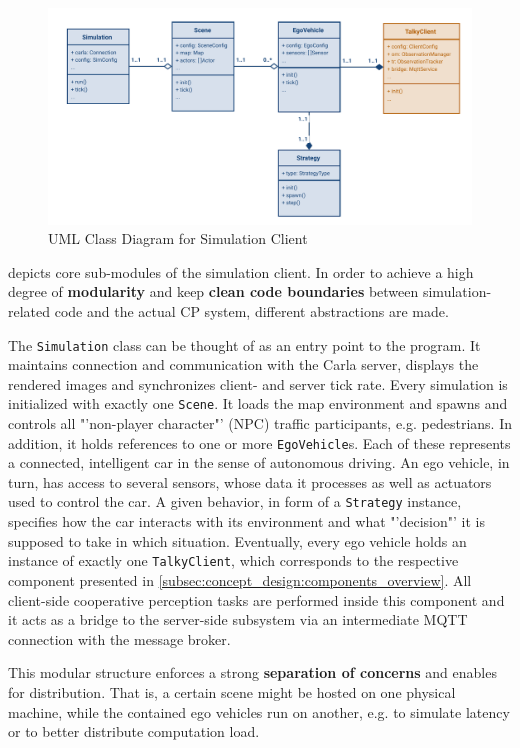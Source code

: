 \begin{figure}
	\centering
	\includegraphics[width=0.9\linewidth]{98_images/client_classes}
	\caption{UML Class Diagram for Simulation Client}
	\label{fig:client_classes}
\end{figure}

 depicts core sub-modules of the simulation client. In order to achieve a high degree of \textbf{modularity} and keep \textbf{clean code boundaries} between simulation-related code and the actual CP system, different abstractions are made.

The \texttt{Simulation} class can be thought of as an entry point to the program. It maintains connection and communication with the Carla server, displays the rendered images and synchronizes client- and server tick rate. Every simulation is initialized with exactly one \texttt{Scene}. It loads the map environment and spawns and controls all "'non-player character"' (NPC) traffic participants, e.g. pedestrians. In addition, it holds references to one or more \texttt{EgoVehicle}s. Each of these represents a connected, intelligent car in the sense of autonomous driving. An ego vehicle, in turn, has access to several sensors, whose data it processes as well as actuators used to control the car. A given behavior, in form of a \texttt{Strategy} instance, specifies how the car interacts with its environment and what "'decision"' it is supposed to take in which situation. Eventually, every ego vehicle holds an instance of exactly one \texttt{TalkyClient}, which corresponds to the respective component presented in \cref{subsec:concept_design:components_overview}. All client-side cooperative perception tasks are performed inside this component and it acts as a bridge to the server-side subsystem via an intermediate MQTT connection with the message broker.

This modular structure enforces a strong \textbf{separation of concerns} and enables for distribution. That is, a certain scene might be hosted on one physical machine, while the contained ego vehicles run on another, e.g. to simulate latency or to better distribute computation load.

